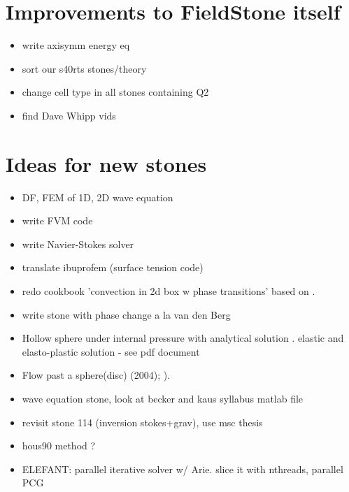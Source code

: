 \documentclass[a4paper]{article}
\begin{document}
\tableofcontents

\newpage
\section{Improvements to FieldStone itself}

\begin{itemize}
\item write axisymm energy eq 
\item sort our s40rts stones/theory
\item change cell type in all stones containing Q2
\item find Dave Whipp vids
\end{itemize}

\newpage
\section{Ideas for new stones}

\begin{itemize}
\item DF, FEM of 1D, 2D wave equation
\item write FVM code
\item write Navier-Stokes solver
\item translate ibuprofem (surface tension code)
\item redo  cookbook 'convection in 2d box w phase transitions'
based on \textcite{chyu85}. 
\item write stone with phase change a la van den Berg \textcite{vava08}
\item Hollow sphere under internal pressure with analytical solution
. elastic and elasto-plastic solution  - see pdf document
\item Flow past a sphere(disc) \textcite{demj04} (2004); 
      \textcite{gafp17}). 
\item wave equation stone, look at becker and kaus syllabus matlab file
\item revisit stone 114 (inversion stokes+grav), use msc thesis 
\item hous90 method ?
\item ELEFANT:  parallel iterative solver w/ Arie. slice it with nthreads, parallel PCG
\end{itemize}

\newpage
\end{document}
